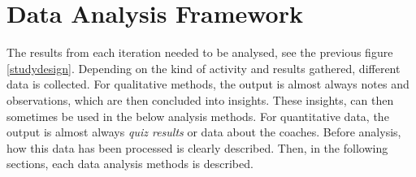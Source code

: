 \section{Data Analysis Framework}\label{dataanalysisframework}




The results from each iteration needed to be analysed, see the previous figure \ref{studydesign}. Depending on the kind of activity and results gathered, different data is collected. For qualitative methods, the output is almost always notes and observations, which are then concluded into insights. These insights, can then sometimes be used in the below analysis methods. For quantitative data, the output is almost always \textit{quiz results} or data about the coaches. Before analysis, how this data has been processed is clearly described. Then, in the following sections, each data analysis methods is described.





%


